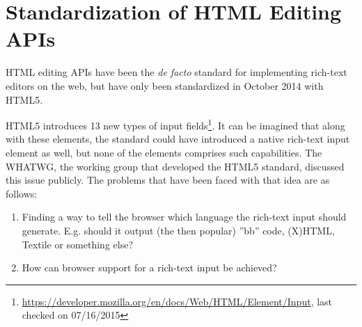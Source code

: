 
\section{Standardization of HTML Editing APIs}
\label{sec:standardization-of-html-editing-apis}





HTML editing APIs have been the \textit{de facto} standard for implementing rich-text editors on the web, but have only been standardized in October 2014 with HTML5. 

HTML5 introduces 13 new types of input fields\footnote{\url{https://developer.mozilla.org/en/docs/Web/HTML/Element/Input}, last checked on 07/16/2015}. It can be imagined that along with these elements, the standard could have introduced a native rich-text input element as well, but none of the elements comprises such capabilities. The WHATWG, the working group that developed the HTML5 standard, discussed this issue publicly. The problems that have been faced with that idea are as follows:


\begin{enumerate} 
\item Finding a way to tell the browser which language the rich-text input should generate. E.g. should it output (the then popular) ''bb'' code, (X)HTML, Textile or something else?
\item How can browser support for a rich-text input be achieved?
\end{enumerate}

